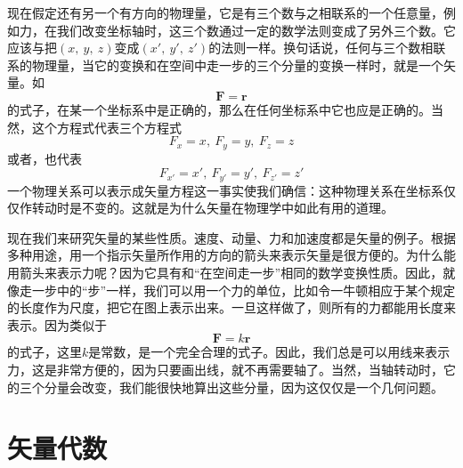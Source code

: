 现在假定还有另一个有方向的物理量，它是有三个数与之相联系的一个任意量，例如力，在我们改变坐标轴时，这三个数通过一定的数学法则变成了另外三个数。它应该与把$(x,~y,~z)$变成$(x',~y',~z')$的法则一样。换句话说，任何与三个数相联系的物理量，当它的变换和在空间中走一步的三个分量的变换一样时，就是一个矢量。如
\begin{equation*}
    \boldsymbol{F}=\boldsymbol{r}
\end{equation*}
的式子，在某一个坐标系中是正确的，那么在任何坐标系中它也应是正确的。当然，这个方程式代表三个方程式
\begin{equation*}
    F_x=x,~F_y=y,~F_z=z
\end{equation*}
或者，也代表
\begin{equation*}
    F_{x'}=x',~F_{y'}=y',~F_{z'}=z'
\end{equation*}
一个物理关系可以表示成矢量方程这一事实使我们确信：这种物理关系在坐标系仅仅作转动时是不变的。这就是为什么矢量在物理学中如此有用的道理。

现在我们来研究矢量的某些性质。速度、动量、力和加速度都是矢量的例子。根据多种用途，用一个指示矢量所作用的方向的箭头来表示矢量是很方便的。为什么能用箭头来表示力呢？因为它具有和“在空间走一步”相同的数学变换性质。因此，就像走一步中的“步”一样，我们可以用一个力的单位，比如令一牛顿相应于某个规定的长度作为尺度，把它在图上表示出来。一旦这样做了，则所有的力都能用长度来表示。因为类似于
\begin{equation*}
    \boldsymbol{F}=k\boldsymbol{r}
\end{equation*}
的式子，这里$k$是常数，是一个完全合理的式子。因此，我们总是可以用线来表示力，这是非常方便的，因为只要画出线，就不再需要轴了。当然，当轴转动时，它的三个分量会改变，我们能很快地算出这些分量，因为这仅仅是一个几何问题。

\section{矢量代数}

